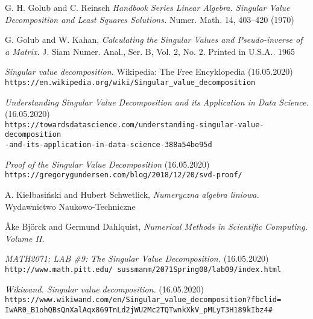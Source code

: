 \documentclass{article}
\theoremstyle{definition}
\begin{document}
\begin{thebibliography}{9}
G. H. Golub and C. Reinsch \textit{Handbook Series Linear Algebra. Singular Value Decomposition and Least Squares Solutions.} Numer. Math. 14, 403--420 (1970)

G. Golub and W. Kahan, \textit{Calculating the Singular Values and Pseudo-inverse of a Matrix.} J. Siam Numer. Anal., Ser. B, Vol. 2, No. 2. Printed in U.S.A.. 1965

\textit{Singular value decomposition.} Wikipedia: The Free Encyklopedia (16.05.2020)
\\\texttt{https://en.wikipedia.org/wiki/Singular\_value\_decomposition} 

\textit{Understanding Singular Value Decomposition and its Application in Data Science.} (16.05.2020)
\\\texttt{https://towardsdatascience.com/understanding-singular-value-decomposition\\-and-its-application-in-data-science-388a54be95d} 

\textit{Proof of the Singular Value Decomposition} (16.05.2020)
\\\texttt{https://gregorygundersen.com/blog/2018/12/20/svd-proof/}

A. Kiełbasiński and Hubert Schwetlick, \textit{Numeryczna algebra liniowa.} Wydawnictwo Naukowo-Techniczne

Åke Björck and Germund Dahlquist, \textit{Numerical Methods in Scientific Computing. Volume II.}

\textit{MATH2071: LAB \#9: The Singular Value Decomposition.} (16.05.2020)
\\\texttt{http://www.math.pitt.edu/~sussmanm/2071Spring08/lab09/index.html}

\textit{Wikiwand. Singular value decomposition.} (16.05.2020)
\\\texttt{https://www.wikiwand.com/en/Singular\_value\_decomposition?fbclid=\\IwAR0\_B1ohQBsQnXalAqx869TnLd2jWU2Mc2TQTwnkXkV\_pMLyT3H189kIbz4\#}
\end{thebibliography}
\end{document}
